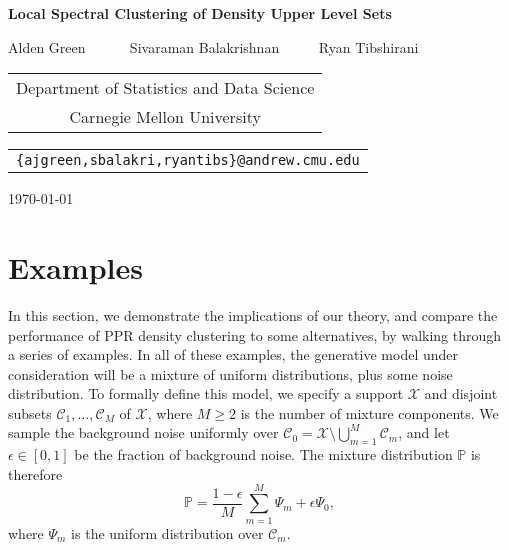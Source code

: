 \documentclass[11pt,twoside]{article}
\newcommand{\1}{\mathbf{1}}
\newcommand{\Pbb}{\mathbb{P}}
\newcommand{\Cset}{\mathcal{C}}
\begin{document}
	
	\begin{center} {\Large{\bf{Local Spectral Clustering of Density Upper Level Sets}}}
		
		\vspace*{.3cm}
		
		{\large{
				\begin{center}
					Alden Green ~~~~~ Sivaraman Balakrishnan~~~~~ Ryan Tibshirani\\
					\vspace{.2cm}
				\end{center}
				
				
				\begin{tabular}{c}
					Department of Statistics and Data Science \\
					Carnegie Mellon University
				\end{tabular}
				
				\vspace*{.2in}
				
				\begin{tabular}{c}
					\texttt{\{ajgreen,sbalakri,ryantibs\}@andrew.cmu.edu}
				\end{tabular}
		}}
		
		\vspace*{.2in}
		
		\today
		\vspace*{.2in}
	
	\end{center}

\section{Examples}
\label{sec:examples}

In this section, we demonstrate the implications of our theory, and compare the performance of PPR density clustering to some alternatives, by walking through a series of examples. In all of these examples, the generative model under consideration will be a mixture of uniform distributions, plus some noise distribution. To formally define this model, we specify a support $\mathcal{X}$ and disjoint subsets $\mathcal{C}_1,\ldots,\mathcal{C}_M$ of $\mathcal{X}$, where $M \geq 2$ is the number of mixture components. We sample the background noise uniformly over $\mathcal{C}_0 = \mathcal{X} \setminus \bigcup_{m = 1}^{M} \mathcal{C}_m$, and let $\epsilon \in [0,1]$ be the fraction of background noise. The mixture distribution $\Pbb$ is therefore
\begin{equation*}
\Pbb = \frac{1 - \epsilon}{M} \sum_{m = 1}^{M} \Psi_m + \epsilon \Psi_0,
\end{equation*}
where $\Psi_m$ is the uniform distribution over $\Cset_m$. 
\end{document}
